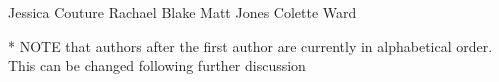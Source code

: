 Jessica Couture
Rachael Blake
Matt Jones
Colette Ward

* NOTE that authors after the first author are currently in alphabetical order.  This can be changed following further discussion

